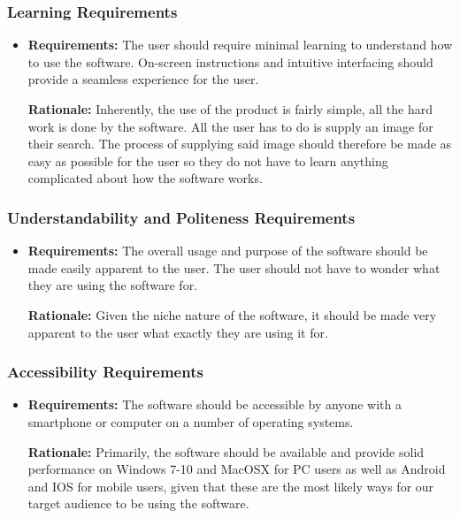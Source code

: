 \documentclass[12pt, titlepage]{article}
\begin{document}
\subsubsection{Learning Requirements}
\begin{itemize}
    \item \textbf{Requirements:} The user should require minimal learning to understand how to use the software. On-screen instructions and intuitive interfacing should provide a seamless experience for the user.
    
    \textbf{Rationale:} Inherently, the use of the product is fairly simple, all the hard work is done by the software. All the user has to do is supply an image for their search. The process of supplying said image should therefore be made as easy as possible for the user so they do not have to learn anything complicated about how the software works.
\end{itemize}

\subsubsection{Understandability and Politeness Requirements}
\begin{itemize}
    \item \textbf{Requirements:} The overall usage and purpose of the software should be made easily apparent to the user. The user should not have to wonder what they are using the software for.
    
    \textbf{Rationale:} Given the niche nature of the software, it should be made very apparent to the user what exactly they are using it for.
\end{itemize}

\subsubsection{Accessibility Requirements}
\begin{itemize}
    \item \textbf{Requirements:} The software should be accessible by anyone with a smartphone or computer on a number of operating systems.
    
    \textbf{Rationale:} Primarily, the software should be available and provide solid performance on Windows 7-10 and MacOSX for PC users as well as Android and IOS for mobile users, given that these are the most likely ways for our target audience to be using the software. 
\end{itemize}
\end{document}
